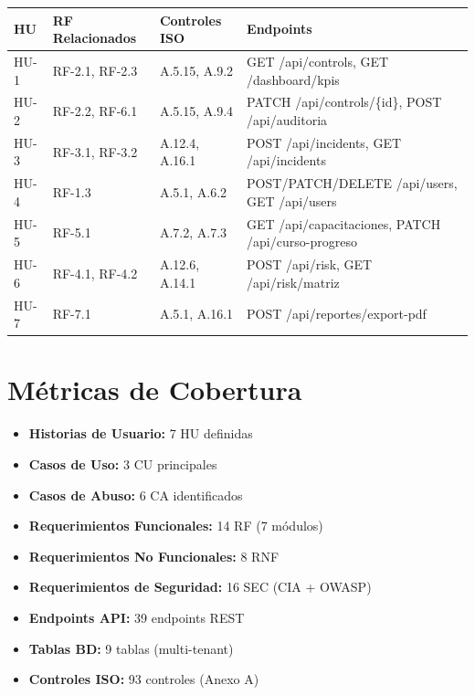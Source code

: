 \documentclass[12pt,a4paper,oneside]{article}
\begin{document}
\begin{tiny}
\begin{tabularx}{\textwidth}{|l|l|l|l|}
\hline
\textbf{HU} & \textbf{RF Relacionados} & \textbf{Controles ISO} & \textbf{Endpoints} \\
\hline
HU-1 & RF-2.1, RF-2.3 & A.5.15, A.9.2 & GET /api/controls, GET /dashboard/kpis \\
\hline
HU-2 & RF-2.2, RF-6.1 & A.5.15, A.9.4 & PATCH /api/controls/\{id\}, POST /api/auditoria \\
\hline
HU-3 & RF-3.1, RF-3.2 & A.12.4, A.16.1 & POST /api/incidents, GET /api/incidents \\
\hline
HU-4 & RF-1.3 & A.5.1, A.6.2 & POST/PATCH/DELETE /api/users, GET /api/users \\
\hline
HU-5 & RF-5.1 & A.7.2, A.7.3 & GET /api/capacitaciones, PATCH /api/curso-progreso \\
\hline
HU-6 & RF-4.1, RF-4.2 & A.12.6, A.14.1 & POST /api/risk, GET /api/risk/matriz \\
\hline
HU-7 & RF-7.1 & A.5.1, A.16.1 & POST /api/reportes/export-pdf \\
\hline
\end{tabularx}
\end{tiny}

\newpage

\section{Métricas de Cobertura}

\begin{itemize}
  \item \textbf{Historias de Usuario:} 7 HU definidas
  \item \textbf{Casos de Uso:} 3 CU principales
  \item \textbf{Casos de Abuso:} 6 CA identificados
  \item \textbf{Requerimientos Funcionales:} 14 RF (7 módulos)
  \item \textbf{Requerimientos No Funcionales:} 8 RNF
  \item \textbf{Requerimientos de Seguridad:} 16 SEC (CIA + OWASP)
  \item \textbf{Endpoints API:} 39 endpoints REST
  \item \textbf{Tablas BD:} 9 tablas (multi-tenant)
  \item \textbf{Controles ISO:} 93 controles (Anexo A)
\end{itemize}
\end{document}
